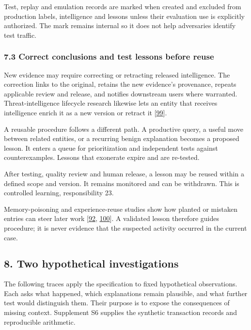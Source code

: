 \documentclass[
  11pt,
]{article}
\begin{document}
Test, replay and emulation records are marked when created and excluded
from production labels, intelligence and lessons unless their evaluation
use is explicitly authorized. The mark remains internal so it does not
help adversaries identify test traffic.

\hypertarget{correct-conclusions-and-test-lessons-before-reuse}{%
\subsubsection{7.3 Correct conclusions and test lessons before
reuse}\label{correct-conclusions-and-test-lessons-before-reuse}}

New evidence may require correcting or retracting released intelligence.
The correction links to the original, retains the new evidence's
provenance, repeats applicable review and release, and notifies
downstream users where warranted. Threat-intelligence lifecycle research
likewise lets an entity that receives intelligence enrich it as a new
version or retract it {[}\protect\hyperlink{ref-Dimitriadis2025}{99}{]}.

A reusable procedure follows a different path. A productive query, a
useful move between related entities, or a recurring benign explanation
becomes a proposed lesson. It enters a queue for prioritization and
independent tests against counterexamples. Lessons that exonerate expire
and are re-tested.

After testing, quality review and human release, a lesson may be reused
within a defined scope and version. It remains monitored and can be
withdrawn. This is controlled learning, responsibility 23.

Memory-poisoning and experience-reuse studies show how planted or
mistaken entries can steer later work
{[}\protect\hyperlink{ref-Dash2026}{92},
\protect\hyperlink{ref-Xiong2026MemoryManagement}{100}{]}. A validated
lesson therefore guides procedure; it is never evidence that the
suspected activity occurred in the current case.

\FloatBarrier

\hypertarget{two-hypothetical-investigations}{%
\subsection{8. Two hypothetical
investigations}\label{two-hypothetical-investigations}}

\suppressfloats[t]

The following traces apply the specification to fixed hypothetical
observations. Each asks what happened, which explanations remain
plausible, and what further test would distinguish them. Their purpose
is to expose the consequences of missing context. Supplement S6 supplies
the synthetic transaction records and reproducible arithmetic.
\end{document}
